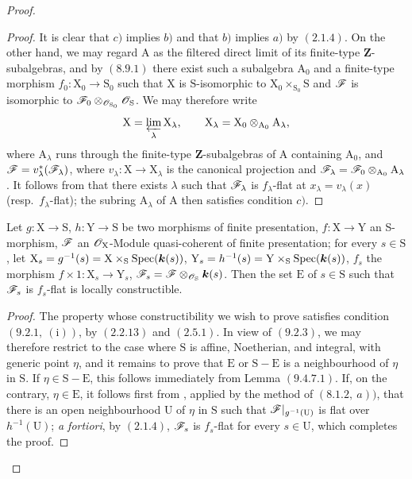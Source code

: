 \begin{proof}
\begin{proof}
It is clear that $c)$ implies $b)$ and that $b)$ implies $a)$ by
$(2.1.4)$. On the other hand, we may regard $\mathrm{A}$ as the filtered
direct limit of its finite-type $\mathbf{Z}$-subalgebras, and by $(8.9.1)$
there exist such a subalgebra $\mathrm{A}_0$ and a finite-type morphism
$f_0:\mathrm{X}_0\to\mathrm{S}_0$ such that $\mathrm{X}$ is
$\mathrm{S}$-isomorphic to
$\mathrm{X}_0\times_{\mathrm{S}_0}\mathrm{S}$ and $\mathscr{F}$ is isomorphic
to $\mathscr{F}_0\otimes_{\mathscr{O}_{\mathrm{S}_0}}\mathscr{O}_{\mathrm{S}}$. We may
therefore write
\[
  \mathrm{X}=\varprojlim_\lambda \mathrm{X}_\lambda,\qquad
  \mathrm{X}_\lambda=\mathrm{X}_0\otimes_{\mathrm{A}_0}\mathrm{A}_\lambda,
\]
where $\mathrm{A}_\lambda$ runs through the finite-type
$\mathbf{Z}$-subalgebras of $\mathrm{A}$ containing $\mathrm{A}_0$, and
$\mathscr{F}=v_\lambda^*(\mathscr{F}_\lambda)$, where
$v_\lambda:\mathrm{X}\to\mathrm{X}_\lambda$ is the canonical projection
and
$\mathscr{F}_\lambda=\mathscr{F}_0\otimes_{\mathrm{A}_0}\mathrm{A}_\lambda$. It
follows from  that there exists $\lambda$ such that
$\mathscr{F}_\lambda$ is $f_\lambda$-flat at
$x_\lambda=v_\lambda(x)$ (resp.\ $f_\lambda$-flat); the subring
$\mathrm{A}_\lambda$ of $\mathrm{A}$ then satisfies condition $c)$.
\end{proof}

\begin{proposition}[11.2.8]
\label{IV.11.2.8}
Let $g:\mathrm{X}\to\mathrm{S}$, $h:\mathrm{Y}\to\mathrm{S}$ be two morphisms of finite presentation, $f:\mathrm{X}\to\mathrm{Y}$ an S-morphism, $\mathscr{F}$ an $\mathscr{O}_\mathrm{X}$-Module quasi-coherent of finite presentation; for every $s\in\mathrm{S}$, let $\mathrm{X}_s=g^{-1}(s)=\mathrm{X}\times_\mathrm{S}\operatorname{Spec}(\boldsymbol{k}(s))$, $\mathrm{Y}_s=h^{-1}(s)=\mathrm{Y}\times_\mathrm{S}\operatorname{Spec}(\boldsymbol{k}(s))$, $f_s$ the morphism $f\times 1:\mathrm{X}_s\to\mathrm{Y}_s$, $\mathscr{F}_s=\mathscr{F}\otimes_{\mathscr{O}_\mathrm{S}}\boldsymbol{k}(s)$. Then the set $\mathrm{E}$ of $s\in\mathrm{S}$ such that $\mathscr{F}_s$ is $f_s$-flat is locally constructible.
\end{proposition}

\begin{proof}
The property whose constructibility we wish to prove satisfies condition
$(9.2.1,~(\mathrm{i}))$, by $(2.2.13)$ and $(2.5.1)$. In view of
$(9.2.3)$, we may therefore restrict to the case where $\mathrm{S}$ is
affine, Noetherian, and integral, with generic point $\eta$, and it remains
to prove that $\mathrm{E}$ or $\mathrm{S}-\mathrm{E}$ is a neighbourhood
of $\eta$ in $\mathrm{S}$. If
$\eta\in\mathrm{S}-\mathrm{E}$, this follows immediately from Lemma
$(9.4.7.1)$. If, on the contrary, $\eta\in\mathrm{E}$, it follows first
from , applied by the method of $(8.1.2,~a))$, that there
is an open neighbourhood $\mathrm{U}$ of $\eta$ in $\mathrm{S}$ such that
$\mathscr{F}|_{g^{-1}(\mathrm{U})}$ is flat over $h^{-1}(\mathrm{U})$; \emph{a
fortiori}, by $(2.1.4)$, $\mathscr{F}_s$ is $f_s$-flat for every
$s\in\mathrm{U}$, which completes the proof.
\end{proof}


\end{proof}
